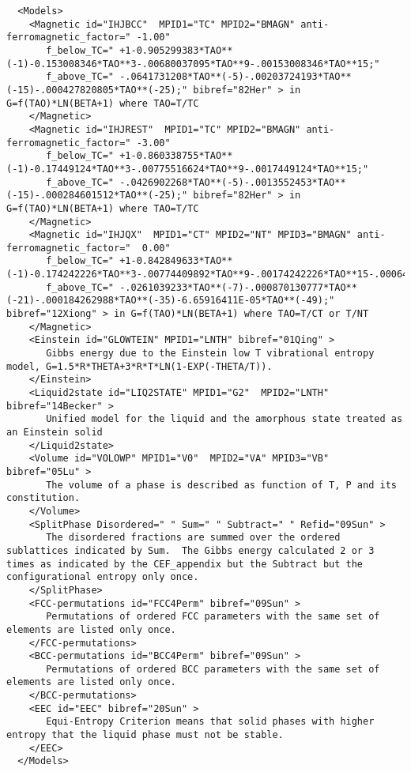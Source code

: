 \documentclass{article}
\begin{document}
\begin{appendices}
{\tiny
\begin{verbatim}
  <Models>
    <Magnetic id="IHJBCC"  MPID1="TC" MPID2="BMAGN" anti-ferromagnetic_factor=" -1.00" 
       f_below_TC=" +1-0.905299383*TAO**(-1)-0.153008346*TAO**3-.00680037095*TAO**9-.00153008346*TAO**15;"
       f_above_TC=" -.0641731208*TAO**(-5)-.00203724193*TAO**(-15)-.000427820805*TAO**(-25);" bibref="82Her" > in G=f(TAO)*LN(BETA+1) where TAO=T/TC
    </Magnetic>
    <Magnetic id="IHJREST"  MPID1="TC" MPID2="BMAGN" anti-ferromagnetic_factor=" -3.00" 
       f_below_TC=" +1-0.860338755*TAO**(-1)-0.17449124*TAO**3-.00775516624*TAO**9-.0017449124*TAO**15;"
       f_above_TC=" -.0426902268*TAO**(-5)-.0013552453*TAO**(-15)-.000284601512*TAO**(-25);" bibref="82Her" > in G=f(TAO)*LN(BETA+1) where TAO=T/TC
    </Magnetic>
    <Magnetic id="IHJQX"  MPID1="CT" MPID2="NT" MPID3="BMAGN" anti-ferromagnetic_factor="  0.00" 
       f_below_TC=" +1-0.842849633*TAO**(-1)-0.174242226*TAO**3-.00774409892*TAO**9-.00174242226*TAO**15-.000646538871*TAO**21;"
       f_above_TC=" -.0261039233*TAO**(-7)-.000870130777*TAO**(-21)-.000184262988*TAO**(-35)-6.65916411E-05*TAO**(-49);" bibref="12Xiong" > in G=f(TAO)*LN(BETA+1) where TAO=T/CT or T/NT
    </Magnetic>
    <Einstein id="GLOWTEIN" MPID1="LNTH" bibref="01Qing" > 
       Gibbs energy due to the Einstein low T vibrational entropy model, G=1.5*R*THETA+3*R*T*LN(1-EXP(-THETA/T)).
    </Einstein>
    <Liquid2state id="LIQ2STATE" MPID1="G2"  MPID2="LNTH" bibref="14Becker" >
       Unified model for the liquid and the amorphous state treated as an Einstein solid
    </Liquid2state>
    <Volume id="VOLOWP" MPID1="V0"  MPID2="VA" MPID3="VB" bibref="05Lu" >
       The volume of a phase is described as function of T, P and its constitution.
    </Volume>
    <SplitPhase Disordered=" " Sum=" " Subtract=" " Refid="09Sun" >
       The disordered fractions are summed over the ordered sublattices indicated by Sum.  The Gibbs energy calculated 2 or 3 times as indicated by the CEF_appendix but the Subtract but the configurational entropy only once.
    </SplitPhase>
    <FCC-permutations id="FCC4Perm" bibref="09Sun" >
       Permutations of ordered FCC parameters with the same set of elements are listed only once.
    </FCC-permutations>
    <BCC-permutations id="BCC4Perm" bibref="09Sun" >
       Permutations of ordered BCC parameters with the same set of elements are listed only once.
    </BCC-permutations>
    <EEC id="EEC" bibref="20Sun" >
       Equi-Entropy Criterion means that solid phases with higher entropy that the liquid phase must not be stable.
    </EEC>
  </Models>
\end{verbatim}
}


\end{appendices}
\end{document}
